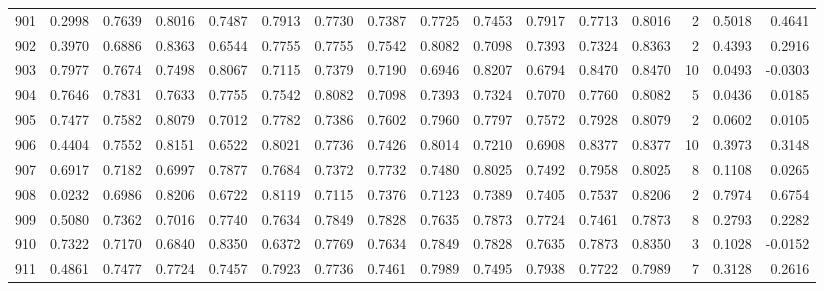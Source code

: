 \begin{tabular}{lrrrrrrrrrrrrrrr}
901 &      0.2998 &  0.7639 &  0.8016 &  0.7487 &  0.7913 &  0.7730 &  0.7387 &  0.7725 &  0.7453 &  0.7917 &   0.7713 &     0.8016 &      2 &                    0.5018 &                     0.4641 \\
902 &      0.3970 &  0.6886 &  0.8363 &  0.6544 &  0.7755 &  0.7755 &  0.7542 &  0.8082 &  0.7098 &  0.7393 &   0.7324 &     0.8363 &      2 &                    0.4393 &                     0.2916 \\
903 &      0.7977 &  0.7674 &  0.7498 &  0.8067 &  0.7115 &  0.7379 &  0.7190 &  0.6946 &  0.8207 &  0.6794 &   0.8470 &     0.8470 &     10 &                    0.0493 &                    -0.0303 \\
904 &      0.7646 &  0.7831 &  0.7633 &  0.7755 &  0.7542 &  0.8082 &  0.7098 &  0.7393 &  0.7324 &  0.7070 &   0.7760 &     0.8082 &      5 &                    0.0436 &                     0.0185 \\
905 &      0.7477 &  0.7582 &  0.8079 &  0.7012 &  0.7782 &  0.7386 &  0.7602 &  0.7960 &  0.7797 &  0.7572 &   0.7928 &     0.8079 &      2 &                    0.0602 &                     0.0105 \\
906 &      0.4404 &  0.7552 &  0.8151 &  0.6522 &  0.8021 &  0.7736 &  0.7426 &  0.8014 &  0.7210 &  0.6908 &   0.8377 &     0.8377 &     10 &                    0.3973 &                     0.3148 \\
907 &      0.6917 &  0.7182 &  0.6997 &  0.7877 &  0.7684 &  0.7372 &  0.7732 &  0.7480 &  0.8025 &  0.7492 &   0.7958 &     0.8025 &      8 &                    0.1108 &                     0.0265 \\
908 &      0.0232 &  0.6986 &  0.8206 &  0.6722 &  0.8119 &  0.7115 &  0.7376 &  0.7123 &  0.7389 &  0.7405 &   0.7537 &     0.8206 &      2 &                    0.7974 &                     0.6754 \\
909 &      0.5080 &  0.7362 &  0.7016 &  0.7740 &  0.7634 &  0.7849 &  0.7828 &  0.7635 &  0.7873 &  0.7724 &   0.7461 &     0.7873 &      8 &                    0.2793 &                     0.2282 \\
910 &      0.7322 &  0.7170 &  0.6840 &  0.8350 &  0.6372 &  0.7769 &  0.7634 &  0.7849 &  0.7828 &  0.7635 &   0.7873 &     0.8350 &      3 &                    0.1028 &                    -0.0152 \\
911 &      0.4861 &  0.7477 &  0.7724 &  0.7457 &  0.7923 &  0.7736 &  0.7461 &  0.7989 &  0.7495 &  0.7938 &   0.7722 &     0.7989 &      7 &                    0.3128 &                     0.2616 \\

\end{tabular}
